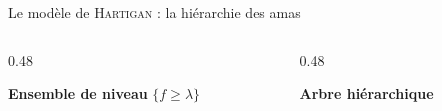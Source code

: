 \begin{frame}{Le modèle de \textsc{Hartigan} : la hiérarchie des amas}
    \begin{columns}[onlytextwidth]
        \begin{column}{0.48\textwidth}
            \begin{center}
                \textbf{Ensemble de niveau} $\{f \ge \lambda\}$

                \vspace{0.3cm}
                
            \end{center}
        \end{column}
        \begin{column}{0.48\textwidth}
            \begin{center}
                \textcolor{inria-rouge}{\textbf{Arbre hiérarchique}}

                \vspace{0.3cm}
                
            \end{center}
        \end{column}
    \end{columns}
\end{frame}

